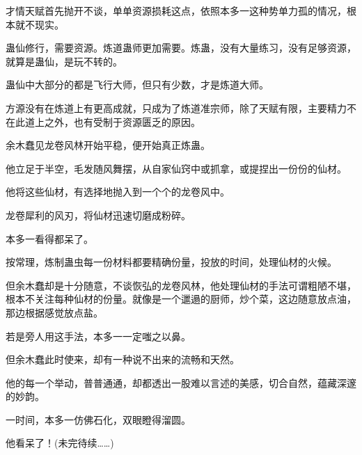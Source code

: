 \begin{this_body}
才情天赋首先抛开不谈，单单资源损耗这点，依照本多一这种势单力孤的情况，根本就不现实。

蛊仙修行，需要资源。炼道蛊师更加需要。炼蛊，没有大量练习，没有足够资源，就算是蛊仙，是玩不转的。

蛊仙中大部分的都是飞行大师，但只有少数，才是炼道大师。

方源没有在炼道上有更高成就，只成为了炼道准宗师，除了天赋有限，主要精力不在此道上之外，也有受制于资源匮乏的原因。

余木蠢见龙卷风林开始平稳，便开始真正炼蛊。

他立足于半空，毛发随风舞摆，从自家仙窍中或抓拿，或提捏出一份份的仙材。

他将这些仙材，有选择地抛入到一个个的龙卷风中。

龙卷犀利的风刃，将仙材迅速切磨成粉碎。

本多一看得都呆了。

按常理，炼制蛊虫每一份材料都要精确份量，投放的时间，处理仙材的火候。

但余木蠢却是十分随意，不谈恢弘的龙卷风林，他处理仙材的手法可谓粗陋不堪，根本不关注每种仙材的份量。就像是一个邋遢的厨师，炒个菜，这边随意放点油，那边根据感觉放点盐。

若是旁人用这手法，本多一一定嗤之以鼻。

但余木蠢此时使来，却有一种说不出来的流畅和天然。

他的每一个举动，普普通通，却都透出一股难以言述的美感，切合自然，蕴藏深邃的妙韵。

一时间，本多一仿佛石化，双眼瞪得溜圆。

他看呆了！(未完待续……)

\end{this_body}

